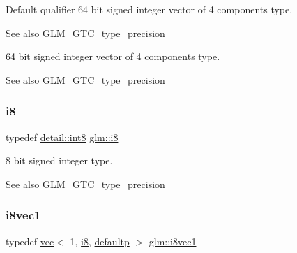 Default qualifier 64 bit signed integer vector of 4 components type. \begin{DoxySeeAlso}{See also}
\mbox{\hyperlink{group__gtc__type__precision}{G\+L\+M\+\_\+\+G\+T\+C\+\_\+type\+\_\+precision}}
\end{DoxySeeAlso}
64 bit signed integer vector of 4 components type. \begin{DoxySeeAlso}{See also}
\mbox{\hyperlink{group__gtc__type__precision}{G\+L\+M\+\_\+\+G\+T\+C\+\_\+type\+\_\+precision}} 
\end{DoxySeeAlso}
\mbox{\label{group__gtc__type__precision_gaae064be68b7d36cd7910c16e8ad18bba}} 
\subsubsection{\texorpdfstring{i8}{i8}}
{\footnotesize\ttfamily typedef \mbox{\hyperlink{namespaceglm_1_1detail_a04b526a8d7a9b455602a0afa78c531e0}{detail\+::int8}} \mbox{\hyperlink{group__gtc__type__precision_gaae064be68b7d36cd7910c16e8ad18bba}{glm\+::i8}}}

8 bit signed integer type. \begin{DoxySeeAlso}{See also}
\mbox{\hyperlink{group__gtc__type__precision}{G\+L\+M\+\_\+\+G\+T\+C\+\_\+type\+\_\+precision}} 
\end{DoxySeeAlso}
\mbox{\label{group__gtc__type__precision_ga1e3db56de9a181840090416b6a5bd5f7}} 
\subsubsection{\texorpdfstring{i8vec1}{i8vec1}}
{\footnotesize\ttfamily typedef \mbox{\hyperlink{structglm_1_1vec}{vec}}$<$ 1, \mbox{\hyperlink{group__gtc__type__precision_gaae064be68b7d36cd7910c16e8ad18bba}{i8}}, \mbox{\hyperlink{namespaceglm_a36ed105b07c7746804d7fdc7cc90ff25a9d21ccd8b5a009ec7eb7677befc3bf51}{defaultp}} $>$ \mbox{\hyperlink{group__gtc__type__precision_ga1e3db56de9a181840090416b6a5bd5f7}{glm\+::i8vec1}}}

